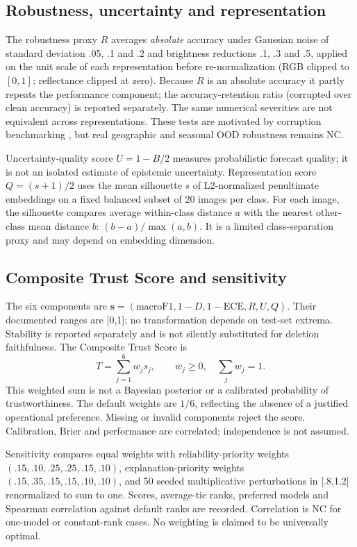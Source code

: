 \documentclass[3p,times,procedia]{elsarticle}
\newcommand{\NC}{\textsc{NC}}
\begin{document}
\subsection{Robustness, uncertainty and representation}\label{sec:pillars}
The robustness proxy $R$ averages \emph{absolute} accuracy under Gaussian noise of standard deviation .05, .1 and .2 and brightness reductions .1, .3 and .5, applied on the unit scale of each representation before re-normalization (RGB clipped to $[0,1]$; reflectance clipped at zero). Because $R$ is an absolute accuracy it partly repeats the performance component; the accuracy-retention ratio (corrupted over clean accuracy) is reported separately. The same numerical severities are not equivalent across representations. These tests are motivated by corruption benchmarking \cite{corruptions}, but real geographic and seasonal OOD robustness remains \NC{}.

Uncertainty-quality score $U=1-B/2$ measures probabilistic forecast quality; it is not an isolated estimate of epistemic uncertainty. Representation score $Q=(s+1)/2$ uses the mean silhouette $s$ \cite{silhouette} of L2-normalized penultimate embeddings on a fixed balanced subset of 20 images per class. For each image, the silhouette compares average within-class distance $a$ with the nearest other-class mean distance $b$: $(b-a)/\max(a,b)$. It is a limited class-separation proxy and may depend on embedding dimension.

\subsection{Composite Trust Score and sensitivity}\label{sec:composite}
The six components are $\mathbf{s}=(\mathrm{macroF1},1-D,1-\mathrm{ECE},R,U,Q)$. Their documented ranges are [0,1]; no transformation depends on test-set extrema. Stability is reported separately and is not silently substituted for deletion faithfulness. The Composite Trust Score is
\begin{equation}T=\sum_{j=1}^{6}w_js_j,\qquad w_j\geq0,\quad\sum_jw_j=1.\label{eq:composite}\end{equation}
This weighted sum is not a Bayesian posterior or a calibrated probability of trustworthiness. The default weights are $1/6$, reflecting the absence of a justified operational preference. Missing or invalid components reject the score. Calibration, Brier and performance are correlated; independence is not assumed.

Sensitivity compares equal weights with reliability-priority weights $(.15,.10,.25,.25,.15,.10)$, explanation-priority weights $(.15,.35,.15,.15,.10,.10)$, and 50 seeded multiplicative perturbations in [.8,1.2] renormalized to sum to one. Scores, average-tie ranks, preferred models and Spearman correlation against default ranks are recorded. Correlation is \NC{} for one-model or constant-rank cases. No weighting is claimed to be universally optimal.
\end{document}
